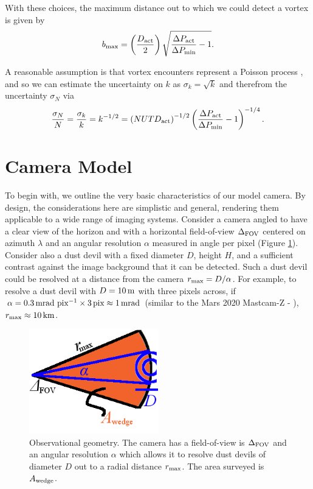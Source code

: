 \documentclass{aastex63}
\begin{document}
With these choices, the maximum distance out to which we could detect a vortex is given by
\begin{equation}
    b_{\rm max} = \left( \frac{D_{\rm act}}{2} \right) \sqrt{ \frac{\Delta P_{\rm act}}{\Delta P_{\rm min}} - 1 }. \label{eqn:bmax}
\end{equation} 

A reasonable assumption is that vortex encounters represent a Poisson process \citep[cf.][]{Press2007}, and so we can estimate the uncertainty on $k$ as $\sigma_k = \sqrt{k}$ and therefrom the uncertainty $\sigma_N$ via
\begin{equation}
    \frac{\sigma_N}{N} = \frac{\sigma_k}{k} = k^{-1/2} = \left ( N U T D_{\rm act} \right)^{-1/2} \left( \frac{\Delta P_{\rm act}}{\Delta P_{\rm min}} - 1 \right)^{-1/4}.
    \label{eqn:sigma_N}
\end{equation}

\section{Camera Model}
To begin with, we outline the very basic characteristics of our model camera. By design, the considerations here are simplistic and general, rendering them applicable to a wide range of imaging systems. Consider a camera angled to have a clear view of the horizon and with a horizontal field-of-view $\Delta_{\rm FOV}$ centered on azimuth $\lambda$ and an angular resolution $\alpha$ measured in angle per pixel (Figure \ref{fig:Awedge}). Consider also a dust devil with a fixed diameter $D$, height $H$, and a sufficient contrast against the image background that it can be detected. Such a dust devil could be resolved at a distance from the camera $r_{\rm max} = D/\alpha$. For example, to resolve a dust devil with $D = 10\,{\rm m}$ with three pixels across, if $\alpha = 0.3\,{\rm mrad\ pix^{-1}} \times 3\,{\rm pix} \approx 1\,{\rm mrad}$ (similar to the Mars 2020 Mastcam-Z - \citealp{2017E&SS....4..396B}), $r_{\rm max} \approx 10\,{\rm km}$.

\begin{figure}
    \centering
    \includegraphics[width=0.5\textwidth]{figures/Awedge.jpg}
    \caption{Observational geometry. The camera has a field-of-view is $\Delta_{\rm FOV}$ and an angular resolution $\alpha$ which allows it to resolve dust devils of diameter $D$ out to a radial distance $r_{\rm max}$. The area surveyed is $A_{\rm wedge}$.}
    \label{fig:Awedge}
\end{figure}
\end{document}
